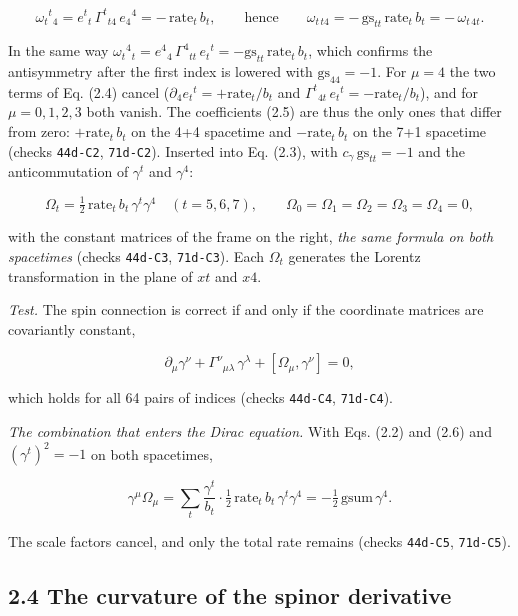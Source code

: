 \documentclass[
  10pt,
]{article}
\begin{document}
\[\omega_t{}^t{}_4=e^t{}_t\,\Gamma^t{}_{t4}\,e_4{}^4=-\,\mathrm{rate}_t\,b_t,
\qquad\text{hence}\qquad
\omega_{t\,t4}=-\,\mathrm{gs}_{tt}\,\mathrm{rate}_t\,b_t=-\,\omega_{t\,4t}.\tag{2.5}\]

In the same way
\(\omega_t{}^4{}_t=e^4{}_4\,\Gamma^4{}_{tt}\,e_t{}^t=-\mathrm{gs}_{tt}\,\mathrm{rate}_t\,b_t\),
which confirms the antisymmetry after the first index is lowered with
\(\mathrm{gs}_{44}=-1\). For \(\mu=4\) the two terms of Eq. (2.4) cancel
(\(\partial_4e_t{}^t=+\mathrm{rate}_t/b_t\) and
\(\Gamma^t{}_{4t}\,e_t{}^t=-\mathrm{rate}_t/b_t\)), and for
\(\mu=0,1,2,3\) both vanish. The coefficients (2.5) are thus the only
ones that differ from zero: \(+\mathrm{rate}_t\,b_t\) on the 4+4
spacetime and \(-\mathrm{rate}_t\,b_t\) on the 7+1 spacetime (checks
\texttt{44d-C2}, \texttt{71d-C2}). Inserted into Eq. (2.3), with
\(c_\gamma\,\mathrm{gs}_{tt}=-1\) and the anticommutation of
\(\gamma^t\) and \(\gamma^4\):

\[\Omega_t=\tfrac12\,\mathrm{rate}_t\,b_t\,\gamma^t\gamma^4\quad(t=5,6,7),\qquad
\Omega_0=\Omega_1=\Omega_2=\Omega_3=\Omega_4=0,\tag{2.6}\]

with the constant matrices of the frame on the right, \emph{the same
formula on both spacetimes} (checks \texttt{44d-C3}, \texttt{71d-C3}).
Each \(\Omega_t\) generates the Lorentz transformation in the plane of
\(xt\) and \(x4\).

\emph{Test.} The spin connection is correct if and only if the
coordinate matrices are covariantly constant,

\[\partial_\mu\gamma^\nu+\Gamma^\nu{}_{\mu\lambda}\,\gamma^\lambda+[\Omega_\mu,\gamma^\nu]=0,\tag{2.7}\]

which holds for all 64 pairs of indices (checks \texttt{44d-C4},
\texttt{71d-C4}).

\emph{The combination that enters the Dirac equation.} With Eqs. (2.2)
and (2.6) and \((\gamma^t)^2=-1\) on both spacetimes,

\[\gamma^\mu\Omega_\mu=\sum_t\frac{\gamma^t}{b_t}\cdot\tfrac12\,\mathrm{rate}_t\,b_t\,\gamma^t\gamma^4
=-\tfrac12\,\mathrm{gsum}\,\gamma^4.\tag{2.8}\]

The scale factors cancel, and only the total rate remains (checks
\texttt{44d-C5}, \texttt{71d-C5}).

\hypertarget{the-curvature-of-the-spinor-derivative}{%
\subsection{2.4 The curvature of the spinor
derivative}\label{the-curvature-of-the-spinor-derivative}}
\end{document}
